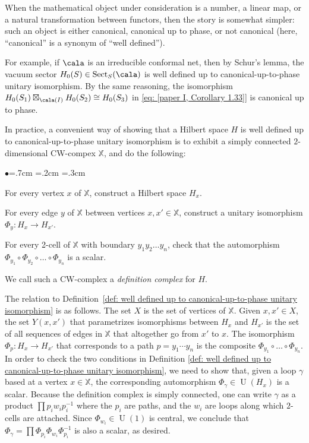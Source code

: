 \documentclass[a4paper,10pt,leqno]{amsart}
\newcommand{\IX}{\mathbb{X}}     \newcommand{\calx}{\mathcal{X}}
\theoremstyle{plain}
\theoremstyle{definition}
\theoremstyle{remark}
\DeclareMathOperator{\Rep}{Sect}
\DeclareMathOperator{\U}{U}
\begin{document}
When the mathematical object under consideration is a number, a linear map, or a natural transformation between functors,
then the story is somewhat simpler: such an object is either canonical, canonical up to phase, or not canonical
(here, ``canonical'' is a synonym of ``well defined'').

For example, if $\cala$ is an irreducible conformal net, 
then by Schur's lemma, the vacuum sector $H_0(S)\in\Rep_S(\cala)$ is well defined up to canonical-up-to-phase unitary isomorphism.
By the same reasoning, the isomorphism $H_0(S_1) \boxtimes_{\cala(I)} H_0(S_2)\cong H_0(S_3)$ in \eqref{eq: [paper I, Corollary 1.33]} is canonical up to phase.

In practice, a convenient way of showing that a Hilbert space $H$ is well defined up to canonical-up-to-phase unitary isomorphism
is to exhibit a simply connected $2$-dimensional CW-compex $\IX$, and do the following:
\begin{list}{$\bullet$}{\leftmargin=.7cm \parsep=1pt =.2cm \listparindent=0pt =.3cm}
\item For every vertex $x$ of $\IX$, construct a Hilbert space $H_x$.
\item For every edge $y$ of $\IX$ between vertices $x,x'\in \IX$, construct a unitary isomorphism $\Phi_y:H_x\to H_{x'}$.
\item For every 2-cell of $\IX$ with boundary $y_1y_2\ldots y_n$, check that the automorphism $\Phi_{y_1}\circ\Phi_{y_2}\circ\ldots\circ \Phi_{y_n}$ is a scalar.
\end{list}
We call such a CW-complex a \emph{definition complex} for $H$.

The relation to Definition~\ref{def: well defined up to canonical-up-to-phase unitary isomorphism} is as follows.
The set $X$ is the set of vertices of $\IX$.
Given $x,x'\in X$, the set $Y(x,x')$ that parametrizes isomorphisms between $H_x$ and $H_{x'}$ is the set of all sequences of edges in $\IX$ that altogether go from $x'$ to $x$. The isomorphism $\Phi_p:H_x\to H_{x'}$ that corresponds to a path $p=y_1\cdots y_n$ is the composite $\Phi_{y_1}\circ\ldots\circ\Phi_{y_n}$.
In order to check the two conditions in Definition \ref{def: well defined up to canonical-up-to-phase unitary isomorphism},
we need to show that, given a loop $\gamma$ based at a vertex $x\in \IX$, the corresponding automorphism $\Phi_\gamma\in\U(H_x)$ is a scalar.
Because the definition complex is simply connected, one can write $\gamma$ as a product $\prod p_i w_i p_i^{-1}$
where the $p_i$ are paths, and the $w_i$ are loops along which $2$-cells are attached.
Since $\Phi_{w_i}\in \U(1)$ is central, we conclude that $\Phi_\gamma=\prod\Phi_{p_i} \Phi_{w_i} \Phi_{p_i}^{-1}$ is also a scalar, as desired.
\end{document}
